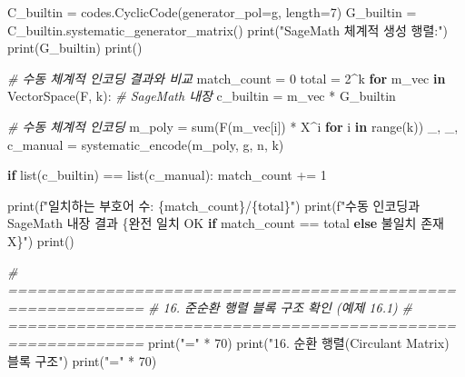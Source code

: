 \documentclass[
  oneside]{article}
\newenvironment{Shaded}{}{}
\newcommand{\BuiltInTok}[1]{\textcolor[rgb]{0.00,0.50,0.00}{#1}}
\newcommand{\CommentTok}[1]{\textcolor[rgb]{0.38,0.63,0.69}{\textit{#1}}}
\newcommand{\ControlFlowTok}[1]{\textcolor[rgb]{0.00,0.44,0.13}{\textbf{#1}}}
\newcommand{\DecValTok}[1]{\textcolor[rgb]{0.25,0.63,0.44}{#1}}
\newcommand{\KeywordTok}[1]{\textcolor[rgb]{0.00,0.44,0.13}{\textbf{#1}}}
\newcommand{\NormalTok}[1]{#1}
\newcommand{\OperatorTok}[1]{\textcolor[rgb]{0.40,0.40,0.40}{#1}}
\newcommand{\SpecialCharTok}[1]{\textcolor[rgb]{0.25,0.44,0.63}{#1}}
\newcommand{\SpecialStringTok}[1]{\textcolor[rgb]{0.73,0.40,0.53}{#1}}
\newcommand{\StringTok}[1]{\textcolor[rgb]{0.25,0.44,0.63}{#1}}
\begin{document}
\begin{Shaded}
\begin{Highlighting}[]
\NormalTok{C\_builtin }\OperatorTok{=}\NormalTok{ codes.CyclicCode(generator\_pol}\OperatorTok{=}\NormalTok{g, length}\OperatorTok{=}\DecValTok{7}\NormalTok{)}
\NormalTok{G\_builtin }\OperatorTok{=}\NormalTok{ C\_builtin.systematic\_generator\_matrix()}
\BuiltInTok{print}\NormalTok{(}\StringTok{"SageMath 체계적 생성 행렬:"}\NormalTok{)}
\BuiltInTok{print}\NormalTok{(G\_builtin)}
\BuiltInTok{print}\NormalTok{()}

\CommentTok{\# 수동 체계적 인코딩 결과와 비교}
\NormalTok{match\_count }\OperatorTok{=} \DecValTok{0}
\NormalTok{total }\OperatorTok{=} \DecValTok{2}\OperatorTok{\^{}}\NormalTok{k}
\ControlFlowTok{for}\NormalTok{ m\_vec }\KeywordTok{in}\NormalTok{ VectorSpace(F, k):}
    \CommentTok{\# SageMath 내장}
\NormalTok{    c\_builtin }\OperatorTok{=}\NormalTok{ m\_vec }\OperatorTok{*}\NormalTok{ G\_builtin}

    \CommentTok{\# 수동 체계적 인코딩}
\NormalTok{    m\_poly }\OperatorTok{=} \BuiltInTok{sum}\NormalTok{(F(m\_vec[i]) }\OperatorTok{*}\NormalTok{ X}\OperatorTok{\^{}}\NormalTok{i }\ControlFlowTok{for}\NormalTok{ i }\KeywordTok{in} \BuiltInTok{range}\NormalTok{(k))}
\NormalTok{    \_, \_, c\_manual }\OperatorTok{=}\NormalTok{ systematic\_encode(m\_poly, g, n, k)}

    \ControlFlowTok{if} \BuiltInTok{list}\NormalTok{(c\_builtin) }\OperatorTok{==} \BuiltInTok{list}\NormalTok{(c\_manual):}
\NormalTok{        match\_count }\OperatorTok{+=} \DecValTok{1}

\BuiltInTok{print}\NormalTok{(}\SpecialStringTok{f"일치하는 부호어 수: }\SpecialCharTok{\{}\NormalTok{match\_count}\SpecialCharTok{\}}\SpecialStringTok{/}\SpecialCharTok{\{}\NormalTok{total}\SpecialCharTok{\}}\SpecialStringTok{"}\NormalTok{)}
\BuiltInTok{print}\NormalTok{(}\SpecialStringTok{f"수동 인코딩과 SageMath 내장 결과 }\SpecialCharTok{\{}\StringTok{\textquotesingle{}완전 일치 OK\textquotesingle{}} \ControlFlowTok{if}\NormalTok{ match\_count }\OperatorTok{==}\NormalTok{ total }\ControlFlowTok{else} \StringTok{\textquotesingle{}불일치 존재 X\textquotesingle{}}\SpecialCharTok{\}}\SpecialStringTok{"}\NormalTok{)}
\BuiltInTok{print}\NormalTok{()}

\CommentTok{\# ============================================================}
\CommentTok{\# 16. 준순환 행렬 블록 구조 확인 (예제 16.1)}
\CommentTok{\# ============================================================}
\BuiltInTok{print}\NormalTok{(}\StringTok{"="} \OperatorTok{*} \DecValTok{70}\NormalTok{)}
\BuiltInTok{print}\NormalTok{(}\StringTok{"16. 순환 행렬(Circulant Matrix) 블록 구조"}\NormalTok{)}
\BuiltInTok{print}\NormalTok{(}\StringTok{"="} \OperatorTok{*} \DecValTok{70}\NormalTok{)}


\end{Highlighting}
\end{Shaded}
\end{document}

